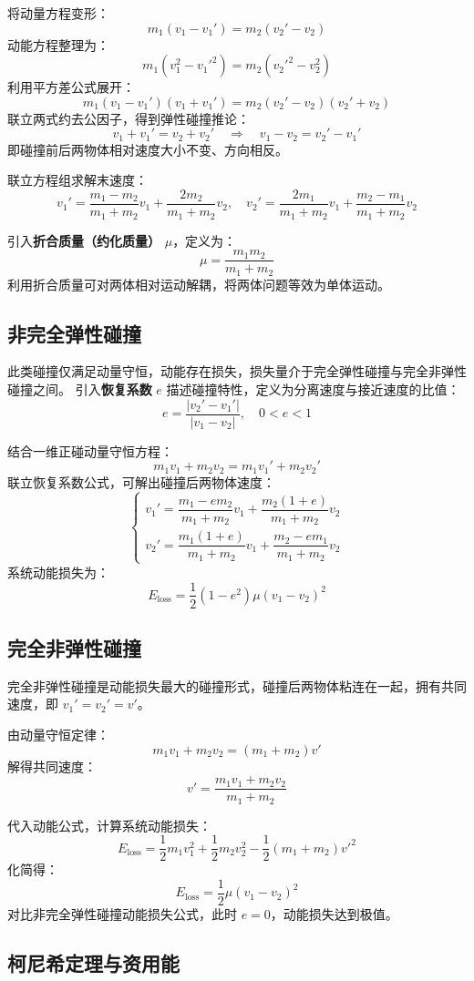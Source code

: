 将动量方程变形：
\[
m_1(v_1 - v_1') = m_2(v_2' - v_2)
\]
动能方程整理为：
\[
m_1(v_1^2 - {v_1'}^2) = m_2({v_2'}^2 - v_2^2)
\]
利用平方差公式展开：
\[
m_1(v_1 - v_1')(v_1 + v_1') = m_2(v_2' - v_2)(v_2' + v_2)
\]
联立两式约去公因子，得到弹性碰撞推论：
\[
v_1 + v_1' = v_2 + v_2' \quad \Longrightarrow \quad v_1 - v_2 = v_2' - v_1'
\]
即碰撞前后两物体相对速度大小不变、方向相反。

联立方程组求解末速度：
\[
v_1' = \frac{m_1 - m_2}{m_1 + m_2}v_1 + \frac{2m_2}{m_1 + m_2}v_2,\quad
v_2' = \frac{2m_1}{m_1 + m_2}v_1 + \frac{m_2 - m_1}{m_1 + m_2}v_2
\]

引入\textbf{折合质量（约化质量）} $\mu$，定义为：
\[
\mu = \frac{m_1 m_2}{m_1 + m_2}
\]
利用折合质量可对两体相对运动解耦，将两体问题等效为单体运动。

\subsection{非完全弹性碰撞}
此类碰撞仅满足动量守恒，动能存在损失，损失量介于完全弹性碰撞与完全非弹性碰撞之间。
引入\textbf{恢复系数} $e$ 描述碰撞特性，定义为分离速度与接近速度的比值：
\[
e = \frac{|v_2' - v_1'|}{|v_1 - v_2|},\quad 0<e<1
\]

结合一维正碰动量守恒方程：
\[
m_1 v_1 + m_2 v_2 = m_1 v_1' + m_2 v_2'
\]
联立恢复系数公式，可解出碰撞后两物体速度：
\[
\begin{cases}
v_1' = \dfrac{m_1 - e m_2}{m_1 + m_2}v_1 + \dfrac{m_2(1+e)}{m_1 + m_2}v_2 \\[4pt]
v_2' = \dfrac{m_1(1+e)}{m_1 + m_2}v_1 + \dfrac{m_2 - e m_1}{m_1 + m_2}v_2
\end{cases}
\]
系统动能损失为：
\[
E_\mathrm{loss} = \frac{1}{2}(1-e^2)\mu (v_1 - v_2)^2
\]

\subsection{完全非弹性碰撞}
完全非弹性碰撞是动能损失最大的碰撞形式，碰撞后两物体粘连在一起，拥有共同速度，即 \(v_1' = v_2' = v'\)。

由动量守恒定律：
\[
m_1 v_1 + m_2 v_2 = (m_1 + m_2) v'
\]
解得共同速度：
\[
v' = \frac{m_1 v_1 + m_2 v_2}{m_1 + m_2}
\]

代入动能公式，计算系统动能损失：
\[
E_\mathrm{loss} = \frac{1}{2}m_1 v_1^2 + \frac{1}{2}m_2 v_2^2 - \frac{1}{2}(m_1+m_2){v'}^2
\]
化简得：
\[
E_\mathrm{loss} = \frac{1}{2}\mu (v_1 - v_2)^2
\]
对比非完全弹性碰撞动能损失公式，此时 \(e=0\)，动能损失达到极值。

\subsection{柯尼希定理与资用能}
